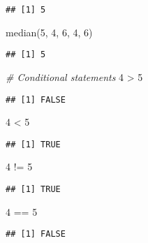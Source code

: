 \documentclass[
]{article}
\newenvironment{Shaded}{\begin{snugshade}}{\end{snugshade}}
\newcommand{\CommentTok}[1]{\textcolor[rgb]{0.56,0.35,0.01}{\textit{#1}}}
\newcommand{\DecValTok}[1]{\textcolor[rgb]{0.00,0.00,0.81}{#1}}
\newcommand{\FunctionTok}[1]{\textcolor[rgb]{0.00,0.00,0.00}{#1}}
\newcommand{\NormalTok}[1]{#1}
\newcommand{\SpecialCharTok}[1]{\textcolor[rgb]{0.00,0.00,0.00}{#1}}
\begin{document}
\begin{verbatim}
## [1] 5
\end{verbatim}

\begin{Shaded}
\begin{Highlighting}[]
\FunctionTok{median}\NormalTok{(}\DecValTok{5}\NormalTok{, }\DecValTok{4}\NormalTok{, }\DecValTok{6}\NormalTok{, }\DecValTok{4}\NormalTok{, }\DecValTok{6}\NormalTok{)}
\end{Highlighting}
\end{Shaded}

\begin{verbatim}
## [1] 5
\end{verbatim}

\begin{Shaded}
\begin{Highlighting}[]
\CommentTok{\# Conditional statements}
\DecValTok{4} \SpecialCharTok{\textgreater{}} \DecValTok{5}
\end{Highlighting}
\end{Shaded}

\begin{verbatim}
## [1] FALSE
\end{verbatim}

\begin{Shaded}
\begin{Highlighting}[]
\DecValTok{4} \SpecialCharTok{\textless{}} \DecValTok{5}
\end{Highlighting}
\end{Shaded}

\begin{verbatim}
## [1] TRUE
\end{verbatim}

\begin{Shaded}
\begin{Highlighting}[]
\DecValTok{4} \SpecialCharTok{!=} \DecValTok{5}
\end{Highlighting}
\end{Shaded}

\begin{verbatim}
## [1] TRUE
\end{verbatim}

\begin{Shaded}
\begin{Highlighting}[]
\DecValTok{4} \SpecialCharTok{==} \DecValTok{5}
\end{Highlighting}
\end{Shaded}

\begin{verbatim}
## [1] FALSE
\end{verbatim}
\end{document}
